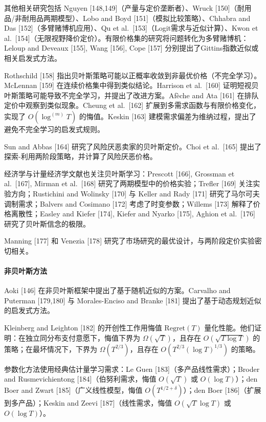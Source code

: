 其他相关研究包括 Nguyen {[}148,149{]}（产量与定价垄断者）、Wruck {[}150{]}（耐用品/非耐用品两期模型）、Lobo and Boyd {[}151{]}（模拟比较策略）、Chhabra and Das {[}152{]}（多臂赌博机应用）、Qu et al.~{[}153{]}（Logit需求与近似计算）、Kwon et al.~{[}154{]}（无限视野降价定价）。有限价格集的研究将问题转化为多臂赌博机：Leloup and Deveaux {[}155{]}, Wang {[}156{]}, Cope {[}157{]} 分别提出了Gittins指数近似或相关启发式方法。

Rothschild {[}158{]} 指出贝叶斯策略可能以正概率收敛到非最优价格（不完全学习）。McLennan {[}159{]} 在连续价格集中得到类似结论。Harrison et al.~{[}160{]} 证明短视贝叶斯策略可能导致不完全学习，并提出了改进方案。Afèche and Ata {[}161{]} 在排队定价中观察到类似现象。Cheung et al.~{[}162{]} 扩展到多需求函数与有限价格变化，实现了 \(O(\log^{(m)} T)\) 的悔值。Keskin {[}163{]} 建模需求偏差为维纳过程，提出了避免不完全学习的启发式规则。

Sun and Abbas {[}164{]} 研究了风险厌恶卖家的贝叶斯定价。Choi et al.~{[}165{]} 提出了探索-利用两阶段策略，并计算了风险厌恶价格。

经济学与计量经济学文献也关注贝叶斯学习：Prescott {[}166{]}, Grossman et al.~{[}167{]}, Mirman et al.~{[}168{]} 研究了两期模型中的价格实验；Trefler {[}169{]} 关注实验方向；Rustichini and Wolinsky {[}170{]} 与 Keller and Rady {[}171{]} 研究了马尔可夫调制需求；Balvers and Cosimano {[}172{]} 考虑了时变参数；Willems {[}173{]} 解释了价格离散性；Easley and Kiefer {[}174{]}, Kiefer and Nyarko {[}175{]}, Aghion et al.~{[}176{]} 研究了贝叶斯信念的极限。

Manning {[}177{]} 和 Venezia {[}178{]} 研究了市场研究的最优设计，与两阶段定价实验密切相关。

\paragraph{非贝叶斯方法}\label{non-bayesian-approaches}

Aoki {[}146{]} 在非贝叶斯框架中提出了基于随机近似的方案。Carvalho and Puterman {[}179,180{]} 与 Morales-Enciso and Branke {[}181{]} 提出了基于动态规划近似的启发式方法。

Kleinberg and Leighton {[}182{]} 的开创性工作用悔值 \(\mathrm{Regret}(T)\) 量化性能。他们证明：在独立同分布支付意愿下，悔值下界为 \(\Omega(\sqrt{T})\)，且存在 \(O(\sqrt{T\log T})\) 的策略；在最坏情况下，下界为 \(\Omega(T^{2/3})\)，且存在 \(O(T^{2/3}(\log T)^{1/3})\) 的策略。

参数化方法使用经典估计量学习需求：Le Guen {[}183{]}（多产品线性需求）；Broder and Rusmevichientong {[}184{]}（伯努利需求，悔值 \(O(\sqrt{T})\) 或 \(O(\log T)\)）；den Boer and Zwart {[}185{]}（广义线性模型，悔值 \(O(T^{1/2 + \delta})\)）；den Boer {[}186{]}（扩展到多产品）；Keskin and Zeevi {[}187{]}（线性需求，悔值 \(O(\sqrt{T} \log T)\) 或 \(O(\log T)\)）。


